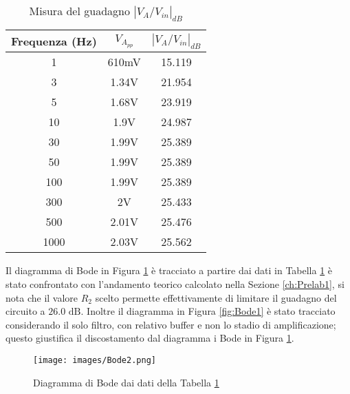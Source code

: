 \begin{table}[H]
    \centering
    \begin{tabular}{|c|c|c|}
        \hline
        Frequenza (Hz)&$V_{A_{pp}}$&$\left|V_A/V_{in}\right|_{dB}$\\\hline\hline
        1&610mV&15.119\\\hline
        3&1.34V&21.954\\\hline
        5&1.68V&23.919\\\hline
        10&1.9V&24.987\\\hline
        30&1.99V&25.389\\\hline
        50&1.99V&25.389\\\hline
        100&1.99V&25.389\\\hline
        300&2V&25.433\\\hline
        500&2.01V&25.476\\\hline
        1000&2.03V&25.562\\\hline
    \end{tabular}
    \caption{Misura del guadagno $\left|V_A/V_{in}\right|_{dB}$}
    \label{tab:Ris1}
\end{table}
Il diagramma di Bode in Figura \ref{fig:Bode2} è tracciato a partire dai dati in Tabella \ref{tab:Ris1} è stato confrontato con l'andamento teorico calcolato nella Sezione \ref{ch:Prelab1}, si nota che il valore $R_2$ scelto permette effettivamente di limitare il guadagno del circuito a $26.0\text{ dB}$. Inoltre il diagramma in Figura \ref{fig:Bode1} è stato tracciato considerando il solo filtro, con relativo buffer e non lo stadio di amplificazione; questo giustifica il discostamento dal diagramma i Bode in Figura \ref{fig:Bode2}.
\begin{figure}[H]
    \centering
    \texttt{[image: images/Bode2.png]}
    \caption{Diagramma di Bode dai dati della Tabella \ref{tab:Ris1}}
    \label{fig:Bode2}
\end{figure}
\clearpage
